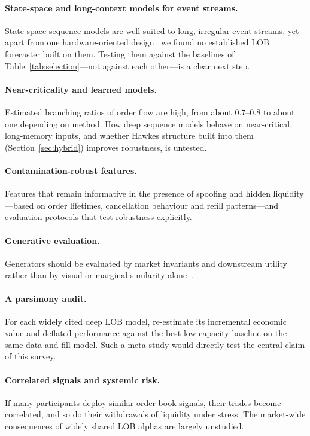 \paragraph{State-space and long-context models for event streams.} State-space sequence models are well
suited to long, irregular event streams, yet apart from one hardware-oriented design~\citep{popov2026ssm} we found no established LOB forecaster built on them.
Testing them against the baselines of Table~\ref{tab:selection}---not against each other---is a clear
next step.

\paragraph{Near-criticality and learned models.} Estimated branching ratios of order flow are high,
from about $0.7$--$0.8$ to about one depending on method. How deep sequence
models behave on near-critical, long-memory inputs, and whether Hawkes structure built into them
(Section~\ref{sec:hybrid}) improves robustness, is untested.

\paragraph{Contamination-robust features.} Features that remain informative in the presence of spoofing
and hidden liquidity---based on order lifetimes, cancellation behaviour and refill patterns---and
evaluation protocols that test robustness explicitly.

\paragraph{Generative evaluation.} Generators should be evaluated by market invariants and downstream
utility rather than by visual or marginal similarity alone~\citep{lobbench2025}.

\paragraph{A parsimony audit.} For each widely cited deep LOB model, re-estimate its incremental
economic value and deflated performance against the best low-capacity baseline on the same data and
fill model. Such a meta-study would directly test the central claim of this survey.

\paragraph{Correlated signals and systemic risk.} If many participants deploy similar order-book signals,
their trades become correlated, and so do their withdrawals of liquidity under stress. The market-wide
consequences of widely shared LOB alphas are largely unstudied.

